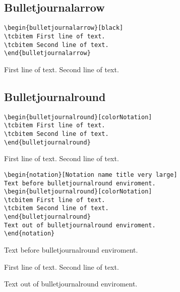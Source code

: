 \subsection{Bulletjournalarrow}

\lipsum[1][1-3]
\begin{highlightbox}
\begin{verbatim}
\begin{bulletjournalarrow}[black]
\tcbitem First line of text.
\tcbitem Second line of text.
\end{bulletjournalarrow}
\end{verbatim}
\end{highlightbox}
\begin{bulletjournalarrow}[black]
\tcbitem First line of text.
\tcbitem Second line of text.
\end{bulletjournalarrow}




\subsection{Bulletjournalround}
\begin{highlightbox}
\begin{verbatim}
\begin{bulletjournalround}[colorNotation]
\tcbitem First line of text.
\tcbitem Second line of text.
\end{bulletjournalround}
\end{verbatim}
\end{highlightbox}
\begin{bulletjournalround}[colorNotation]
\tcbitem First line of text.
\tcbitem Second line of text.
\end{bulletjournalround}


\lipsum[1][1-3]
\begin{highlightbox}
\begin{verbatim}
\begin{notation}[Notation name title very large]
Text before bulletjournalround enviroment.
\begin{bulletjournalround}[colorNotation]
\tcbitem First line of text.
\tcbitem Second line of text.
\end{bulletjournalround}
Text out of bulletjournalround enviroment.
\end{notation}
\end{verbatim}
\end{highlightbox}
\begin{notation}
Text before bulletjournalround enviroment.
\begin{bulletjournalround}[colorNotation]
\tcbitem First line of text.
\tcbitem Second line of text.
\end{bulletjournalround}
Text out of bulletjournalround enviroment.
\end{notation}




